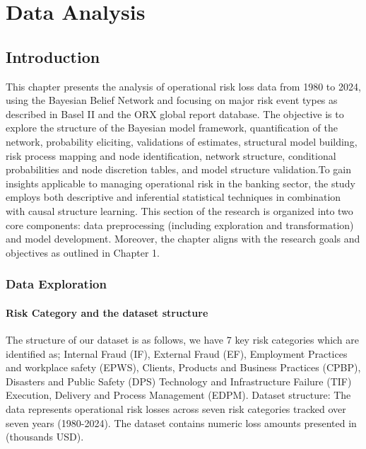 \chapter{Data Analysis}
\section{Introduction} 
This chapter presents the analysis of operational risk loss data from 1980 to 2024, using the Bayesian Belief Network and focusing on major risk event types as described in Basel II and the ORX global report database. The objective is to explore the structure of the Bayesian model framework, quantification of the network, probability eliciting, validations of estimates, structural model building, risk process mapping and node identification, network structure, conditional probabilities and node discretion tables, and model structure validation.To gain insights applicable to managing operational risk in the banking sector, the study employs both descriptive and inferential statistical techniques in combination with causal structure learning. This section of the research is organized into two core components: data preprocessing (including exploration and transformation) and model development. Moreover, the chapter aligns with the research goals and objectives as outlined in Chapter 1. 

\subsection{Data Exploration}
\subsubsection{Risk Category and the dataset structure}
The structure of our dataset is as follows, we have 7 key risk categories which are identified as; Internal Fraud (IF), External Fraud (EF), Employment Practices and workplace safety (EPWS), Clients, Products and Business Practices (CPBP), Disasters and Public Safety (DPS) Technology and Infrastructure Failure (TIF) Execution, Delivery and Process Management (EDPM). Dataset structure: The data represents operational risk losses across seven risk categories tracked over seven years (1980-2024). The dataset contains numeric loss amounts presented in (thousands USD).

